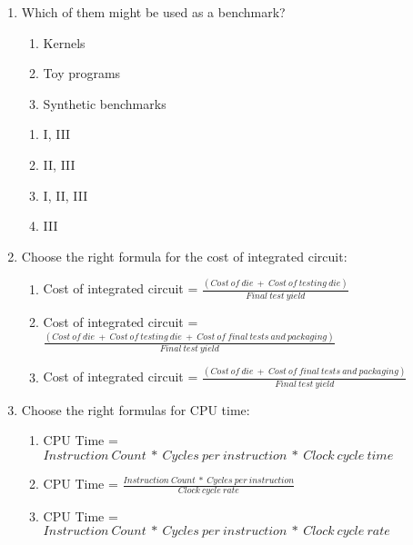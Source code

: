 \documentclass[paper=8.2in:11.6in]{scrartcl}
\begin{document}

\begin{enumerate}

\item Which of them might be used as a benchmark?

\begin{enumerate}[label=\Roman*.]

\item Kernels
\item Toy programs
\item Synthetic benchmarks

\end{enumerate}

\begin{enumerate}[label=\alph*)]

\item I, III
\item II, III
\item I, II, III
\item III

\end{enumerate}

\item Choose the right formula for the cost of integrated circuit:

\begin{enumerate}[label=\alph*)]

\item Cost of integrated circuit = $ \frac{\left( Cost \ of \ die \ + \ Cost \ of \ testing \ die \right)}{Final \ test \ yield} $
\item Cost of integrated circuit = $ \frac{\left( Cost \ of \ die \ + \ Cost \ of \ testing \ die \ + \ Cost \  of \ final \ tests \ and \ packaging \right)}{Final \ test \ yield}  $
\item Cost of integrated circuit = $ \frac{\left( Cost \ of \ die \ + \ Cost \ of \ final \ tests \ and  \ packaging \right)}{Final \ test \ yield} $

\end{enumerate}

\item Choose the right formulas for CPU time:

\begin{enumerate}[label=\Roman*.]

\item CPU Time = $ Instruction \ Count \ * \ Cycles \ per \ instruction \ * \ Clock \ cycle \ time $
\item CPU Time = $ \frac{Instruction \ Count \ * \ Cycles \ per \ instruction}{Clock \ cycle \ rate} $
\item CPU Time = $ Instruction \ Count \ * \ Cycles \ per \ instruction \ * \ Clock \ cycle \ rate $


\end{enumerate}
\end{enumerate}
\end{document}
